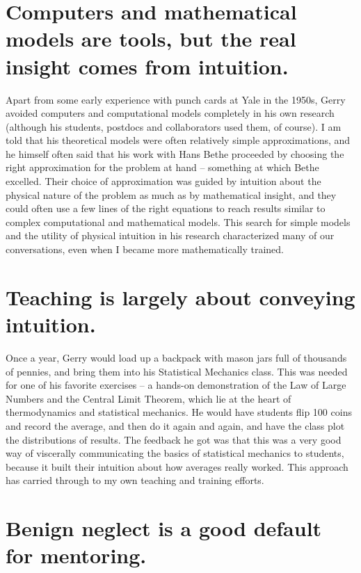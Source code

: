 \section*{Computers and mathematical models are tools, but the real insight
comes from intuition.}

Apart from some early experience with punch cards at Yale in the
1950s, Gerry avoided computers and computational models completely in
his own research (although his students, postdocs and collaborators
used them, of course). I am told that his theoretical models were
often relatively simple approximations, and he himself often said that
his work with Hans Bethe proceeded by choosing the right approximation
for the problem at hand -- something at which Bethe excelled. Their
choice of approximation was guided by intuition about the physical
nature of the problem as much as by mathematical insight, and they
could often use a few lines of the right equations to reach results
similar to complex computational and mathematical models. This search
for simple models and the utility of physical intuition in his
research characterized many of our conversations, even when I became
more mathematically trained.

\section*{Teaching is largely about conveying intuition.}

Once a year, Gerry would load up a backpack with mason jars full of
thousands of pennies, and bring them into his Statistical Mechanics
class. This was needed for one of his favorite exercises -- a hands-on
demonstration of the Law of Large Numbers and the Central Limit
Theorem, which lie at the heart of thermodynamics and statistical
mechanics. He would have students flip 100 coins and record the
average, and then do it again and again, and have the class plot the
distributions of results. The feedback he got was that this was a very
good way of viscerally communicating the basics of statistical
mechanics to students, because it built their intuition about how
averages really worked. This approach has carried through to my own
teaching and training efforts.

\section*{Benign neglect is a good default for mentoring.}

